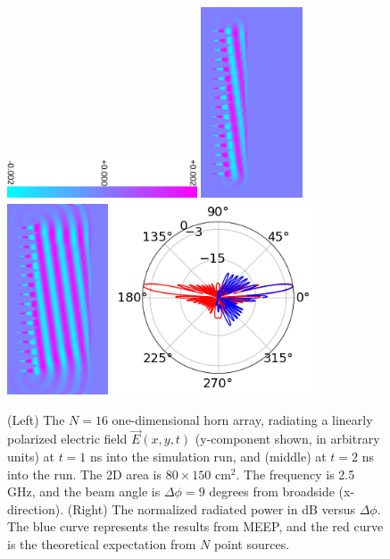 \documentclass[../../main.tex]{subfiles}
\begin{document}
\begin{figure}
\centering
\includegraphics[width=5.625cm,angle=90]{figures/fields/colorbar.pdf}
\includegraphics[width=3cm]{figures/fields/ey_phase_horn_t30.png}
\includegraphics[width=3cm]{figures/fields/ey_phase_horn_t60.png}
\includegraphics[width=6cm]{figures/fields/rad_patt_field.png}
\caption{\label{fig:1dhornresults2} (Left) The $N = 16$ one-dimensional horn array, radiating a linearly polarized electric field $\vec{E}(x,y,t)$ (y-component shown, in arbitrary units) at $t = 1$ ns into the simulation run, and (middle) at $t = 2$ ns into the run.  The 2D area is $80 \times 150$ cm$^2$.  The frequency is 2.5 GHz, and the beam angle is $\Delta \phi = 9$ degrees from broadside (x-direction). (Right) The normalized radiated power in dB versus $\Delta \phi$.  The blue curve represents the results from MEEP, and the red curve is the theoretical expectation from $N$ point sources.}
\end{figure}
\end{document}

